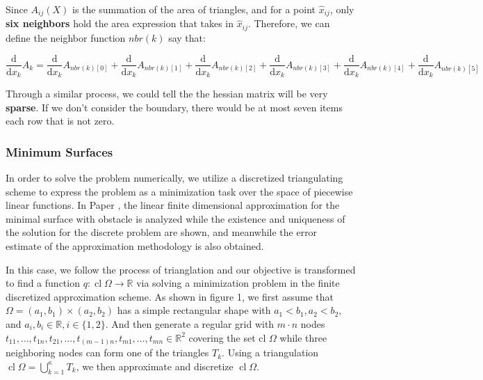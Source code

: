 Since $A_{ij}(X)$ is the summation of the area of triangles, and for a point $\hat{x}_{ij}$, only \textbf{six neighbors} hold the area expression that takes in $\hat{x}_{ij}$. Therefore, we can define the neighbor function $nbr(k)$ say that:

\begin{equation}
    \frac{\mathrm{d}}{\mathrm{d}x_k}A_k = \frac{\mathrm{d}}{\mathrm{d}x_k}A_{nbr(k)[0]} + \frac{\mathrm{d}}{\mathrm{d}x_k}A_{nbr(k)[1]} + \frac{\mathrm{d}}{\mathrm{d}x_k}A_{nbr(k)[2]} + \frac{\mathrm{d}}{\mathrm{d}x_k}A_{nbr(k)[3]} + \frac{\mathrm{d}}{\mathrm{d}x_k}A_{nbr(k)[4]} + \frac{\mathrm{d}}{\mathrm{d}x_k}A_{nbr(k)[5]} 
\end{equation}

Through a similar process, we could tell the the hessian matrix will be very \textbf{sparse}. If we don't consider the boundary, there would be at most seven items each row that is not zero.

\subsubsection{Minimum Surfaces}
In order to solve the problem numerically, we utilize a discretized triangulating scheme to express the problem as a minimization task over the space of piecewise linear functions. In Paper \cite{shen1992finite}, the linear finite dimensional approximation for the minimal surface with obstacle is analyzed while the existence and uniqueness of the solution for the discrete problem are shown, and meanwhile the error estimate of the approximation methodology is also obtained. 

In this case, we follow the process of trianglation and our objective is transformed to find a function  $q: \operatorname{cl} \Omega \rightarrow \mathbb{R}$ via solving a minimization problem in the finite discretized approximation scheme. As shown in figure 1, we first assume that $\Omega=\left(a_{1}, b_{1}\right) \times\left(a_{2}, b_{2}\right)$ has a simple rectangular shape with $a_{1}<b_{1}, a_{2}<b_{2},$ and $a_{i}, b_{i} \in \mathbb{R}, i \in\{1,2\} .$ And then generate a regular grid with $m \cdot n$ nodes $t_{11}, \ldots, t_{1 n}, t_{21}, \ldots, t_{(m-1) n}, t_{m 1}, \ldots, t_{m n} \in \mathbb{R}^{2}$
covering the set cl $\Omega$ while three neighboring nodes can form one of the triangles $T_{k} .$ Using a triangulation $\operatorname{cl} \Omega=\bigcup_{k=1}^{\kappa} T_{k}$, we then approximate and discretize $\operatorname{cl} \Omega$.



